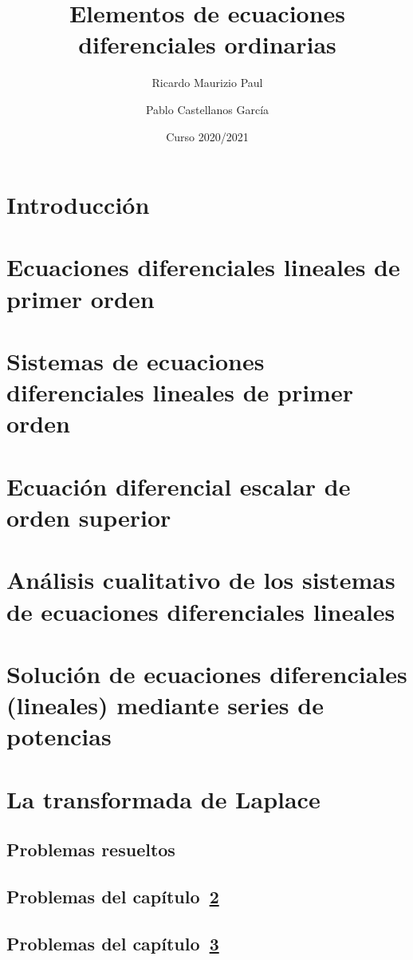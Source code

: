 \documentclass{report}
\title{Elementos de ecuaciones diferenciales ordinarias}
\author{Ricardo Maurizio Paul \and Pablo Castellanos García}
\date{Curso 2020/2021}
\begin{document}
\maketitle
\tableofcontents

\setcounter{chapter}{-1}
\chapter{Introducción}


\chapter{Ecuaciones diferenciales lineales de primer orden}
\label{chap:capitulo1}


\chapter{Sistemas de ecuaciones diferenciales lineales de primer orden}
\label{chap:capitulo2}



\chapter{Ecuación diferencial escalar de orden superior}
\label{chap:capitulo3}


\chapter{Análisis cualitativo de los sistemas de ecuaciones diferenciales lineales}
\label{chap:capitulo4}


\chapter{Solución de ecuaciones diferenciales (lineales) mediante series de potencias}
\label{chap:capitulo5}


\chapter{La transformada de Laplace}
\label{chap:capitulo6}


\begin{appendices}

\chapter{Problemas resueltos}

\section{Problemas del capítulo~\ref{chap:capitulo1}}


\section{Problemas del capítulo~\ref{chap:capitulo2}}


\end{appendices}
\end{document}
